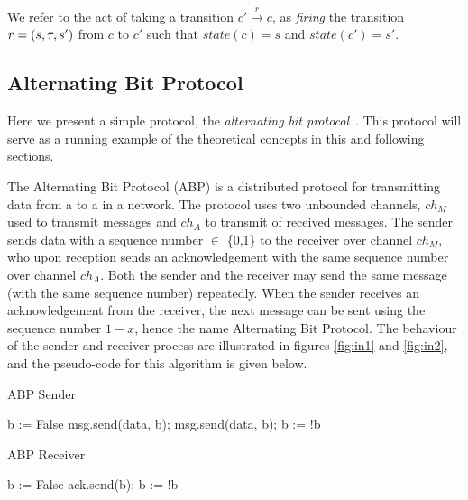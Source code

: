 We refer to the act of taking a transition $c' \xrightarrow{r} c$, as \emph{firing} the transition $r=(s,\tau,s')$ from $c$ to $c'$ such that $state(c)=s$ and $state(c')=s'$.

\subsection{Alternating Bit Protocol}
Here we present a simple protocol, the \emph{alternating bit protocol}~\cite{bartlett1969note}. This protocol will serve as a running example of the theoretical concepts in this and following sections.

The Alternating Bit Protocol (ABP)\cite{foldoc} is a distributed protocol for transmitting data from a  to a  in a network. The protocol uses two unbounded channels, $ch_M$ used to transmit messages and $ch_A$ to transmit  of received messages. The sender sends data with a sequence number  $\in$ \{0,1\} to the receiver over channel $ch_M$, who upon reception sends an acknowledgement with the same sequence number over channel $ch_A$. Both the sender and the receiver may send the same message (with the same sequence number) repeatedly. When the sender receives an acknowledgement from the receiver, the next message can be sent using the sequence number $1-x$, hence the name Alternating Bit Protocol. The behaviour of the sender and receiver process are illustrated in figures \ref{fig:in1} and \ref{fig:in2}, and the pseudo-code for this algorithm is given below.

\begin{algorithm}
  \caption{ABP Sender}
  \label{senderpseudo}
\begin{algorithmic}[1]
    \State b := False 
      \State msg.send(data, b); 
       
      \State msg.send(data, b); 
      \EndWhile
      \State b := !b 
    \EndFor
\end{algorithmic}
\end{algorithm}


\begin{algorithm}
  \caption{ABP Receiver}
  \label{senderpseudo}
\begin{algorithmic}[1]
    \State b := False 
       
      \State ack.send(b); 
      \EndWhile
      \State b := !b 
    \EndFor
\end{algorithmic}
\end{algorithm}

